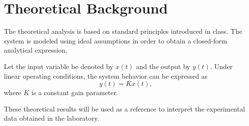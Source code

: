 \section{Theoretical Background}
\label{sec:theory}

The theoretical analysis is based on standard principles introduced in class.
The system is modeled using ideal assumptions in order to obtain a closed-form
analytical expression.

Let the input variable be denoted by $x(t)$ and the output by $y(t)$. Under linear
operating conditions, the system behavior can be expressed as
\[
y(t) = K x(t),
\]
where $K$ is a constant gain parameter.

These theoretical results will be used as a reference to interpret the experimental
data obtained in the laboratory.